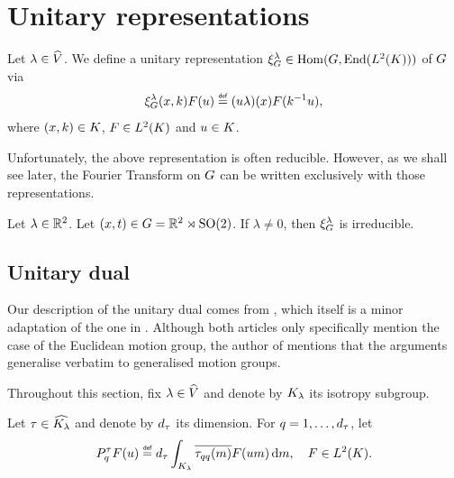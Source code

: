 \section{Unitary representations}

\begin{definition}
\label{definition:reducible_representation}
    Let $\lambda \in {\widehat{V}}$.
    We define a unitary representation $\xi^{\lambda}_G \in \operatorname{Hom}(G, \operatorname{End}({L^{2} (K)}))$ of $G$ via
    \begin{align}
        \Rep{\lambda} (x, k) F(u) \defeq (u \lambda)(x) F(k^{-1} u),
    \end{align}
    where $(x, k) \in K$, $F \in {L^{2} (K)}$ and $u \in K$.
\end{definition}

Unfortunately, the above representation is often reducible.
However, as we shall see later, the Fourier Transform on $G$ can be written exclusively with those representations.

\begin{example}
    Let $\lambda \in \mathbb{R}^2$.
    Let $(x, t) \in G = \mathbb{R}^2 \rtimes {\mathrm{SO} (2)}$.
    If $\lambda \neq 0$, then $\xi^{\lambda}_G$ is irreducible.
\end{example}

\subsection{Unitary dual}

Our description of the unitary dual comes from \cite{Kumahara73},
which itself is a minor adaptation of the one in \cite{Ito52}.
Although both articles only specifically mention the case of the Euclidean motion group,
the author of \cite{Ito52} mentions that the arguments generalise verbatim to generalised motion groups.

Throughout this section, fix $\lambda \in {\widehat{V}}$
and denote by ${{K}_{\lambda}}$ its isotropy subgroup.

Let $\tau \in {\widehat{{{K}_{\lambda}}}}$ and denote by ${d_{\tau}}$ its dimension.
For $q = 1, \dots, {d_{\tau}}$, let
\begin{align}
    P^\tau_q F(u) \defeq \dimRep{\tau} \int_\IsotropySubgroup{\CompactGroup}{\lambda} \conj{\tau_{qq}(m)} F(u m) \dd m,
    \quad F \in \Lebesgue{2}{\CompactGroup}.
    \label{eq:projection_on_L2_of_the_compact_group}
\end{align}

